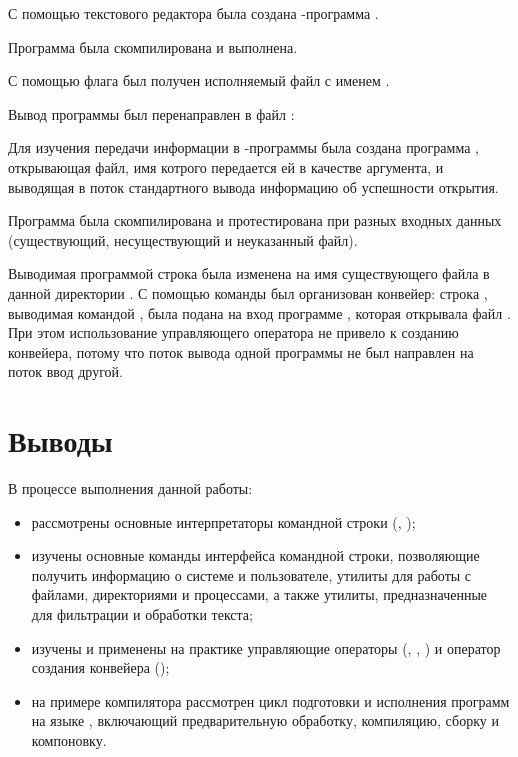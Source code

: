 С помощью текстового редактора  была создана -программа .


Программа была скомпилирована и выполнена.


С помощью флага  был получен исполняемый файл с именем .


\newpage

Вывод программы был перенаправлен в файл :


Для изучения передачи информации в -программы была создана программа , открывающая файл, имя котрого передается ей в качестве аргумента, и выводящая в поток стандартного вывода информацию об успешности открытия.


Программа была скомпилирована и протестирована при разных входных данных (существующий, несуществующий и неуказанный файл).


Выводимая программой  строка была изменена на имя существующего файла в данной директории . С помощью команды  был организован конвейер: строка , выводимая командой , была подана на вход программе , которая открывала файл . При этом использование управляющего оператора \code{||} не привело к созданию конвейера, потому что поток вывода одной программы не был направлен на поток ввод другой.

\newpage
 


\section{Выводы}

В процессе выполнения данной работы:
\begin{itemize}
	\item рассмотрены основные интерпретаторы командной строки (, );
	\item изучены основные команды интерфейса командной строки, позволяющие получить информацию о системе и пользователе, утилиты для работы с файлами, директориями и процессами, а также утилиты, предназначенные для фильтрации и обработки текста;
	\item изучены и применены на практике управляющие операторы (\code{\&}, \code{\&\&}, \code{||}) и оператор создания конвейера (\code{|});
	\item на примере компилятора  рассмотрен цикл подготовки и исполнения программ на языке , включающий предварительную обработку, компиляцию, сборку и компоновку.
\end{itemize}


